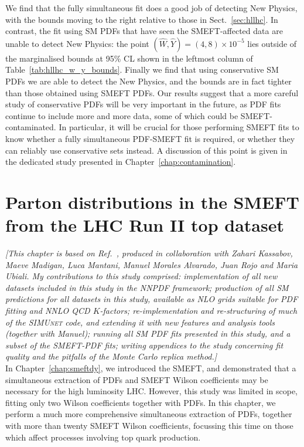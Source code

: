 \documentclass[withindex,glossary]{cam-thesis}
\begin{document}
We find that the fully simultaneous fit does a good job of detecting New Physics, with the
bounds moving to the right relative to those in Sect.~\ref{sec:hllhc}. In contrast, the fit using SM PDFs that have
seen the SMEFT-affected data are unable to detect New Physics: the point $(\hat{W},\hat{Y}) = (4,8) \times 10^{-5}$
lies outside of the marginalised bounds at 95\% CL shown in the leftmost column of Table~\ref{tab:hllhc_w_y_bounds}. Finally
we find that using conservative SM PDFs we are able to detect the New Physics, and the bounds
are in fact tighter than those obtained using SMEFT PDFs. Our results suggest that a more careful
study of conservative PDFs will be very important in the future, as PDF fits continue to include
more and more data, some of which could be SMEFT-contaminated. In particular, it will be crucial
for those performing SMEFT fits to know whether a fully simultaneous PDF-SMEFT fit is required,
or whether they can reliably use conservative sets instead. A discussion of this point is given in the
dedicated study presented in Chapter~\ref{chap:contamination}.







\newpage
\chapter{Parton distributions in the SMEFT from the LHC Run II top dataset}
\label{chap:top}

\noindent \textit{[This chapter is based on Ref.~\cite{Kassabov:2023hbm}, produced in collaboration with Zahari Kassabov, Maeve Madigan, Luca Mantani, Manuel Morales Alvarado, Juan Rojo and Maria Ubiali. My contributions to this study comprised: implementation of all new datasets included in this study in the NNPDF framework; production of all SM predictions for all datasets in this study, available as NLO grids suitable for PDF fitting and NNLO QCD $K$-factors; re-implementation and re-structuring of much of the \textsc{SIMUnet} code, and extending it with new features and analysis tools (together with Manuel); running all SM PDF fits presented in this study, and a subset of the SMEFT-PDF fits; writing appendices to the study concerning fit quality and the pitfalls of the Monte Carlo replica method.]}\\

\noindent In Chapter~\ref{chap:smeftdy}, we introduced the SMEFT, and demonstrated that a simultaneous extraction of PDFs and SMEFT Wilson coefficients may be necessary for the high luminosity LHC. However, this study was limited in scope, fitting only two Wilson coefficients together with PDFs. In this chapter, we perform a much more comprehensive simultaneous extraction of PDFs, together with more than twenty SMEFT Wilson coefficients, focussing this time on those which affect processes involving top quark production.
 
\end{document}
